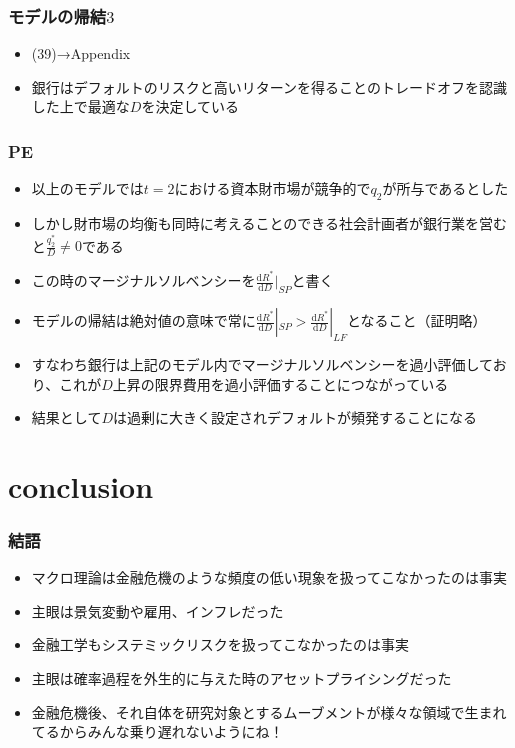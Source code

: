 \documentclass[dvipdfmx, 12pt]{beamer}
\begin{document}
\begin{frame}\frametitle{モデルの帰結$3$}
	\begin{itemize}
		\item (39)→Appendix
		\item 銀行はデフォルトのリスクと高いリターンを得ることのトレードオフを認識した上で最適な$D$を決定している
	\end{itemize}
\end{frame}

\begin{frame}\frametitle{PE}
	\begin{itemize}
		\item 以上のモデルでは$t=2$における資本財市場が競争的で$q_2$が所与であるとした
		\item しかし財市場の均衡も同時に考えることのできる社会計画者が銀行業を営むと$\frac{q_2^*}{D} \neq 0$である
		\item この時のマージナルソルベンシーを$\frac{\mathrm{d}R^*}{\mathrm{d}D}|_{SP}$と書く
		\item モデルの帰結は絶対値の意味で常に$\frac{\mathrm{d}R^*}{\mathrm{d}D}|_{SP} > \frac{\mathrm{d}R^*}{\mathrm{d}D}|_{LF}$となること（証明略）
		\item すなわち銀行は上記のモデル内でマージナルソルベンシーを過小評価しており、これが$D$上昇の限界費用を過小評価することにつながっている
		\item 結果として$D$は過剰に大きく設定されデフォルトが頻発することになる
	\end{itemize}
\end{frame}

\section{conclusion}
\begin{frame}\frametitle{結語}
	\begin{itemize}
		\item マクロ理論は金融危機のような頻度の低い現象を扱ってこなかったのは事実
		\item 主眼は景気変動や雇用、インフレだった
		\item 金融工学もシステミックリスクを扱ってこなかったのは事実
		\item 主眼は確率過程を外生的に与えた時のアセットプライシングだった
		\item 金融危機後、それ自体を研究対象とするムーブメントが様々な領域で生まれてるからみんな乗り遅れないようにね！
	\end{itemize}
\end{frame}
\end{document}
